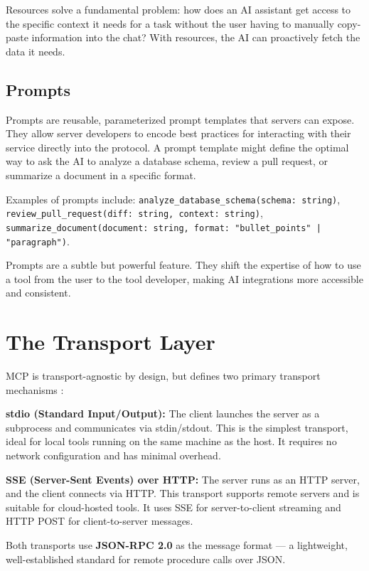 Resources solve a fundamental problem: how does an AI assistant get access to the specific context it needs for a task without the user having to manually copy-paste information into the chat? With resources, the AI can proactively fetch the data it needs.

\subsection{Prompts}
Prompts are reusable, parameterized prompt templates that servers can expose. They allow server developers to encode best practices for interacting with their service directly into the protocol. A prompt template might define the optimal way to ask the AI to analyze a database schema, review a pull request, or summarize a document in a specific format.

Examples of prompts include: \texttt{analyze\_database\_schema(schema: string)}, \texttt{review\_pull\_request(diff: string, context: string)}, \texttt{summarize\_document(document: string, format: "bullet\_points" | "paragraph")}.

Prompts are a subtle but powerful feature. They shift the expertise of how to use a tool from the user to the tool developer, making AI integrations more accessible and consistent.

\section{The Transport Layer}
MCP is transport-agnostic by design, but defines two primary transport mechanisms \cite{anthropic2024mcp}:

\textbf{stdio (Standard Input/Output):} The client launches the server as a subprocess and communicates via stdin/stdout. This is the simplest transport, ideal for local tools running on the same machine as the host. It requires no network configuration and has minimal overhead.

\textbf{SSE (Server-Sent Events) over HTTP:} The server runs as an HTTP server, and the client connects via HTTP. This transport supports remote servers and is suitable for cloud-hosted tools. It uses SSE for server-to-client streaming and HTTP POST for client-to-server messages.

Both transports use \textbf{JSON-RPC 2.0} as the message format — a lightweight, well-established standard for remote procedure calls over JSON.

